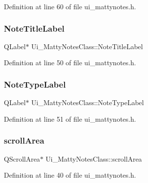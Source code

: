 Definition at line 60 of file ui\+\_\+mattynotes.\+h.

\hypertarget{classUi__MattyNotesClass_a97f01bf32630dedfa41e7ad7a29d625f}{}\label{classUi__MattyNotesClass_a97f01bf32630dedfa41e7ad7a29d625f} 
\subsubsection{\texorpdfstring{Note\+Title\+Label}{NoteTitleLabel}}
{\footnotesize\ttfamily Q\+Label$\ast$ Ui\+\_\+\+Matty\+Notes\+Class\+::\+Note\+Title\+Label}



Definition at line 50 of file ui\+\_\+mattynotes.\+h.

\hypertarget{classUi__MattyNotesClass_a48fa5329cbef0c993de74749b395e26f}{}\label{classUi__MattyNotesClass_a48fa5329cbef0c993de74749b395e26f} 
\subsubsection{\texorpdfstring{Note\+Type\+Label}{NoteTypeLabel}}
{\footnotesize\ttfamily Q\+Label$\ast$ Ui\+\_\+\+Matty\+Notes\+Class\+::\+Note\+Type\+Label}



Definition at line 51 of file ui\+\_\+mattynotes.\+h.

\hypertarget{classUi__MattyNotesClass_ae86843a493941b949a4ab67b1b85c2cf}{}\label{classUi__MattyNotesClass_ae86843a493941b949a4ab67b1b85c2cf} 
\subsubsection{\texorpdfstring{scroll\+Area}{scrollArea}}
{\footnotesize\ttfamily Q\+Scroll\+Area$\ast$ Ui\+\_\+\+Matty\+Notes\+Class\+::scroll\+Area}



Definition at line 40 of file ui\+\_\+mattynotes.\+h.

